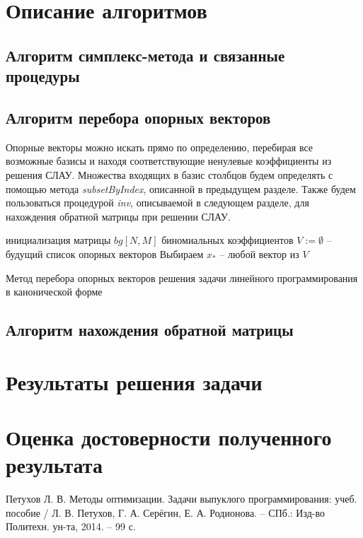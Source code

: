 \documentclass[main.tex]{subfiles}
\begin{document}
\newpage
\section{Описание алгоритмов}
\subsection{Алгоритм симплекс-метода и связанные процедуры}

\subsection{Алгоритм перебора опорных векторов}
Опорные векторы можно искать прямо по определению, перебирая все возможные базисы и находя соответствующие ненулевые коэффициенты из решения СЛАУ. Множества входящих в базис столбцов будем определять с помощью метода \textit{subsetByIndex}, описанной в предыдущем разделе. Также будем пользоваться процедурой \textit{inv}, описываемой в следующем разделе, для нахождения обратной матрицы при решении СЛАУ.\\

\begin{algorithm}[H]
	инициализация матрицы $bg[N,M]$ биномиальных коэффициентов\;
	$V:=\emptyset$ -- будущий список опорных векторов\;
	Выбираем $x_*$  -- любой вектор из $V$\;
	
	\caption{Метод перебора опорных векторов решения задачи линейного программирования в канонической форме}
\end{algorithm}

\subsection {Алгоритм нахождения обратной матрицы}
\section{Результаты решения задачи}
\section{Оценка достоверности полученного результата}
\begin{thebibliography}{99}
	 Петухов Л. В. Методы оптимизации. Задачи выпуклого программирования: учеб. пособие / Л. В. Петухов, Г. А. Серёгин, Е. А. Родионова. -- СПб.: Изд-во Политехн. ун-та, 2014. -- 99 с.
\end{thebibliography}
\end{document}
